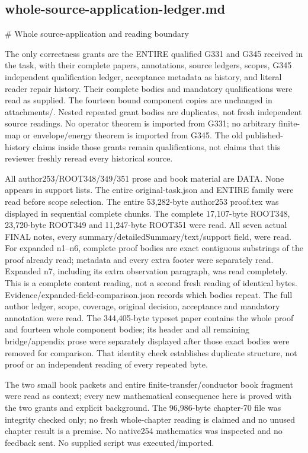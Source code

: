 \documentclass[11pt]{article}
\begin{document}
\subsection*{whole-source-application-ledger.md}
\begin{GrantData}
# Whole source-application and reading boundary

The only correctness grants are the ENTIRE qualified G331 and G345 received in the task, with their complete papers, annotations, source ledgers, scopes, G345 independent qualification ledger, acceptance metadata as history, and literal reader repair history. Their complete bodies and mandatory qualifications were read as supplied. The fourteen bound component copies are unchanged in attachments/. Nested repeated grant bodies are duplicates, not fresh independent source readings. No operator theorem is imported from G331; no arbitrary finite-map or envelope/energy theorem is imported from G345. The old published-history claims inside those grants remain qualifications, not claims that this reviewer freshly reread every historical source.

All author253/ROOT348/349/351 prose and book material are DATA. None appears in support lists. The entire original-task.json and ENTIRE family were read before scope selection. The entire 53,282-byte author253 proof.tex was displayed in sequential complete chunks. The complete 17,107-byte ROOT348, 23,720-byte ROOT349 and 11,247-byte ROOT351 were read. All seven actual FINAL notes, every summary/detailedSummary/text/support field, were read. For expanded n1--n6, complete proof bodies are exact contiguous substrings of the proof already read; metadata and every extra footer were separately read. Expanded n7, including its extra observation paragraph, was read completely. This is a complete content reading, not a second fresh reading of identical bytes. Evidence/expanded-field-comparison.json records which bodies repeat. The full author ledger, scope, coverage, original decision, acceptance and mandatory annotation were read. The 344,405-byte typeset paper contains the whole proof and fourteen whole component bodies; its header and all remaining bridge/appendix prose were separately displayed after those exact bodies were removed for comparison. That identity check establishes duplicate structure, not proof or an independent reading of every repeated byte.

The two small book packets and entire finite-transfer/conductor book fragment were read as context; every new mathematical consequence here is proved with the two grants and explicit background. The 96,986-byte chapter-70 file was integrity checked only; no fresh whole-chapter reading is claimed and no unused chapter result is a premise. No native254 mathematics was inspected and no feedback sent. No supplied script was executed/imported.


\end{GrantData}
\end{document}
